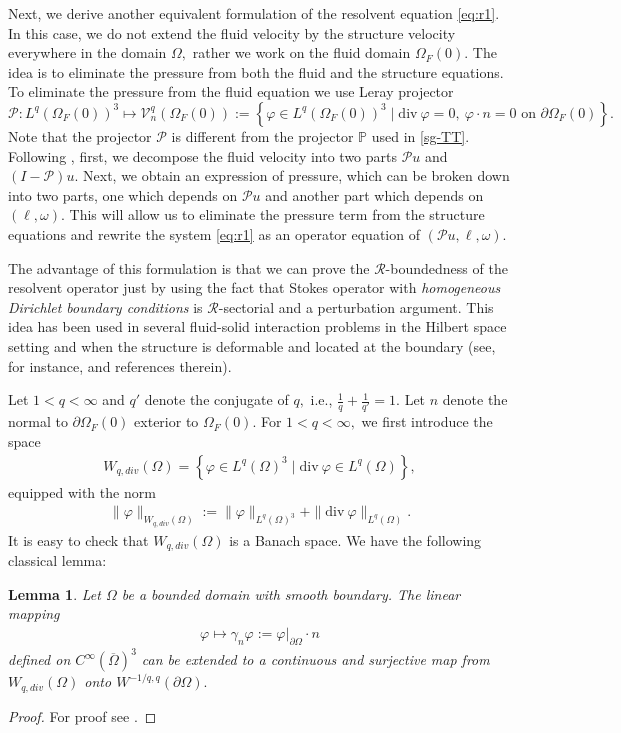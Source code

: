 \documentclass[12pt,a4paper,reqno]{amsart}
\newtheorem{lemma}[theorem]{Lemma}
\theoremstyle{definition}
\theoremstyle{remark}
\numberwithin{equation}{section}
\newcommand{\ofo}{\Omega_{F}(0)}
\newcommand{\ds}{\displaystyle}
\newcommand{\mr}{\mathcal{R}}
\newcommand{\mpp}{\mathcal{P}}
\begin{document}
Next, we derive another equivalent formulation of the resolvent equation \eqref{eq:r1}. In this case, we do not extend the fluid velocity by the structure velocity everywhere in the domain $\Omega,$ rather we work on the fluid domain $\ofo.$    The idea is to eliminate the pressure from both the fluid and the structure equations. To eliminate the pressure from the fluid equation we use Leray projector $$\mpp : L^{q}(\ofo)^{3} \mapsto \mathcal{V}^q_{n} (\ofo) := \left \{\varphi \in { L}^q(\ofo)^{3} \mid \mathrm{div} \ \varphi = 0, \ \varphi \cdot { n} = 0 \mbox{ on } \partial\ofo\right\}.$$
Note that the projector $\mpp$ is different from the projector $\mathbb{P}$ used in \eqref{sg-TT}.
Following  \cite{Raymond}, first, we  decompose  the fluid velocity into two parts  $\mathcal{P}u$ and $(I-\mpp)u.$ Next, we obtain an expression of pressure, which can be broken down into two parts, one which depends on $\mpp u$ and another part which depends on $(\ell, \omega).$  This will allow us to eliminate the pressure term from the structure equations  and  rewrite the system \eqref{eq:r1} as an operator equation of $(\mpp u, \ell, \omega).$

 The advantage of this formulation is that we can prove the $\mr$-boundedness of the resolvent operator just by using the fact that Stokes operator with {\em homogeneous Dirichlet boundary conditions} is $\mr$-sectorial and a perturbation argument.  This idea has been used in several fluid-solid interaction problems in the Hilbert space setting and when the structure is deformable and located at the boundary (see, for instance, \cite{Raymond-fsi,  MR17} and references therein).

Let $1 < q < \infty$ and $q'$ denote the conjugate of $q,$ i.e., $\ds \frac{1}{q} + \frac{1}{q'}=1.$ Let $ n$ denote the  normal to $\partial \ofo$ exterior to $\ofo.$  For $1< q< \infty,$ we first introduce the  space
\begin{align*}
W_{q, div } (\Omega) = \left\{ \varphi \in L^{q}(\Omega)^{3} \mid \mathrm{div} \ \varphi \in L^{q}(\Omega) \right\},
\end{align*}
equipped with the norm
\begin{align*}
\|\varphi\|_{W_{q, div } (\Omega)} := \|\varphi\|_{L^{q}(\Omega)^{3}} + \|\mathrm{div} \ \varphi \|_{L^{q}(\Omega)}.
\end{align*}
It is easy to check that $W_{q, div } (\Omega)$ is a Banach space. We have the following classical lemma:
\begin{lemma} \label{Normaltrace}
Let $\Omega$ be a bounded domain with smooth boundary. The linear mapping
\begin{align*}
\varphi \mapsto \gamma_{n} \varphi := \varphi|_{\partial\Omega}  \cdot n
\end{align*}
defined on $C^{\infty}(\overline{\Omega})^{3}$ can be extended to a continuous and surjective map from $W_{q, div } (\Omega)$ onto $W^{-1/q,q}(\partial\Omega).$
\end{lemma}
\begin{proof}
For proof see \cite[Lemma 1]{Fujiwara}.
\end{proof}
\end{document}

